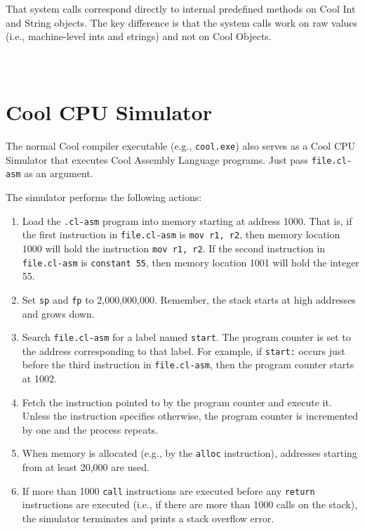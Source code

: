 \documentclass[]{article}
\begin{document}
That system calls correspond directly to internal predefined methods on
Cool Int and String objects. The key difference is that the system calls
work on raw values (i.e., machine-level ints and strings) and not on
Cool Objects.

\section{\\ Cool CPU Simulator}

The normal Cool compiler executable (e.g., \texttt{cool.exe}) also
serves as a Cool CPU Simulator that executes Cool Assembly Language
programs. Just pass \texttt{file.cl-asm} as an argument.

The simulator performs the following actions:

\begin{enumerate}
\itemsep1pt\parskip0pt
\item
  Load the \texttt{.cl-asm} program into memory starting at address
  1000. That is, if the first instruction in \texttt{file.cl-asm} is
  \texttt{mov r1, r2}, then memory location 1000 will hold the
  instruction \texttt{mov r1, r2}. If the second instruction in
  \texttt{file.cl-asm} is \texttt{constant 55}, then memory location
  1001 will hold the integer 55.
\item
  Set \texttt{sp} and \texttt{fp} to 2,000,000,000. Remember, the stack
  starts at high addresses and grows down.
\item
  Search \texttt{file.cl-asm} for a label named \texttt{start}. The
  program counter is set to the address corresponding to that label. For
  example, if \texttt{start:} occurs just before the third instruction
  in \texttt{file.cl-asm}, then the program counter starts at 1002.
\item
  Fetch the instruction pointed to by the program counter and execute
  it. Unless the instruction specifies otherwise, the program counter is
  incremented by one and the process repeats.
\item
  When memory is allocated (e.g., by the \texttt{alloc} instruction),
  addresses starting from at least 20,000 are used.
\item
  If more than 1000 \texttt{call} instructions are executed before any
  \texttt{return} instructions are executed (i.e., if there are more
  than 1000 calls on the stack), the simulator terminates and prints a
  stack overflow error.
\end{enumerate}
\end{document}
